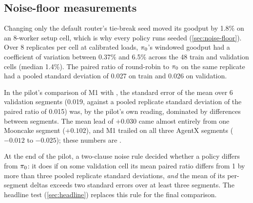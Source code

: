 \subsection{Noise-floor measurements}

Changing only the default router's tie-break seed moved its goodput by 1.8\% on an 8-worker setup
cell, which is why every policy runs seeded (\cref{sec:noise-floor}).
Over 8 replicates per cell at calibrated loads, $\pi_{0}$'s windowed goodput had a coefficient of
variation between 0.37\% and 6.5\% across the 48 train and validation cells (median 1.4\%). The
paired ratio of round-robin to $\pi_{0}$ on the same replicate had a pooled standard deviation of
0.027 on train and 0.026 on validation.

In the pilot's comparison of M1 with , the standard error of the mean
over 6 validation segments (0.019, against a pooled replicate standard deviation of the paired
ratio of 0.015) was, by
the pilot's own reading, dominated by differences between segments. The mean lead of $+0.030$ came
almost entirely from one Mooncake segment ($+0.102$), and M1 trailed on all three AgentX segments
($-0.012$ to $-0.025$); these numbers are \prelim.

At the end of the pilot, a two-clause noise rule decided whether a policy differs from $\pi_{0}$: it
does if on some validation cell its mean paired ratio differs from 1 by more than three pooled
replicate standard deviations, \emph{and} the mean of its per-segment deltas exceeds two standard
errors over at least three segments. The headline test (\cref{sec:headline}) replaces this rule for
the final comparison.

